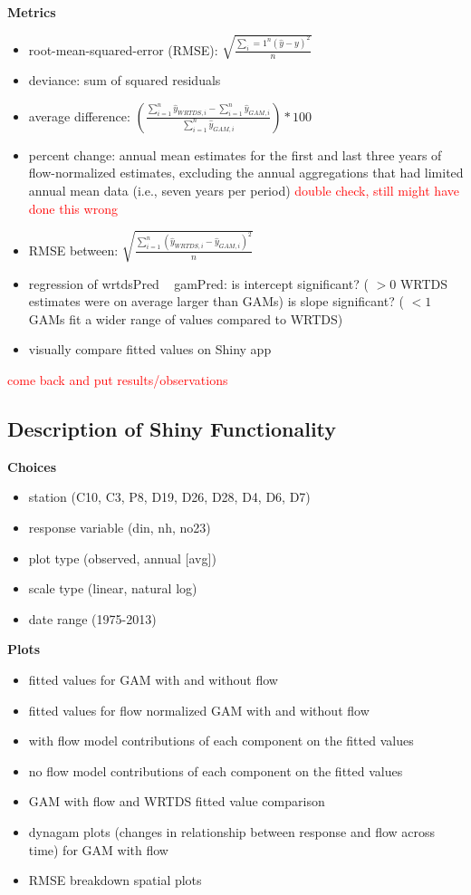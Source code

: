 \documentclass[12pt]{amsart}
\begin{document}
\textbf{Metrics}
\begin{itemize}
\item root-mean-squared-error (RMSE): $\sqrt{\frac{\sum_{i}=1^n (\hat{y}-y)^2}{n}}$
\item deviance: sum of squared residuals
\item average difference: $\left(\frac{\sum_{i=1}^n \hat{y}_{WRTDS,i}-\sum_{i=1}^n \hat{y}_{GAM,i}}{\sum_{i=1}^n \hat{y}_{GAM,i}}\right)*100$
\item percent change: annual mean estimates for the first and last three years of flow-normalized estimates, excluding the annual aggregations that had limited annual mean data (i.e., seven years per period) \textcolor{red}{double check, still might have done this wrong}
\item RMSE between: $\sqrt{\frac{\sum_{i=1}^n (\hat{y}_{WRTDS,i}-\hat{y}_{GAM,i})^2}{n}}$
\item regression of wrtdsPred ~ gamPred: is intercept significant? ( $>0$ WRTDS estimates were on average larger than GAMs) is slope significant? ( $<1$ GAMs fit a wider range of values compared to WRTDS)
\item visually compare fitted values on Shiny app
\end{itemize}


\textcolor{red}{come back and put results/observations}

\subsection{Description of Shiny Functionality}

\textbf{Choices}
\begin{itemize}
\item station (C10, C3, P8, D19, D26, D28, D4, D6, D7)
\item response variable (din, nh, no23)
\item plot type (observed, annual [avg])
\item scale type (linear, natural log)
\item date range (1975-2013)
\end{itemize}

\textbf{Plots}
\begin{itemize}
\item fitted values for GAM with and without flow
\item fitted values for flow normalized GAM with and without flow 
\item with flow model contributions of each component  on the fitted values
\item no flow model contributions of each component  on the fitted values
\item GAM with flow and WRTDS fitted value comparison
\item dynagam plots (changes in relationship between response and flow across time) for GAM with flow 
\item RMSE breakdown spatial plots
\end{itemize}
\end{document}
